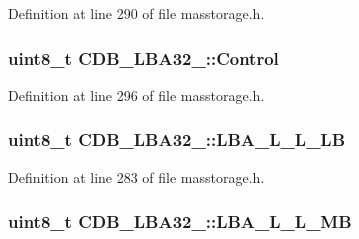 \-Definition at line 290 of file masstorage.\-h.

\hypertarget{struct_c_d_b___l_b_a32__16_aed4424e6a3afd515084359084a5e8fcb}{
\subsubsection[{\-Control}]{\setlength{\rightskip}{0pt plus 5cm}uint8\-\_\-t {\bf \-C\-D\-B\-\_\-\-L\-B\-A32\-\_\-::\-Control}}}\label{struct_c_d_b___l_b_a32__16_aed4424e6a3afd515084359084a5e8fcb}


\-Definition at line 296 of file masstorage.\-h.

\hypertarget{struct_c_d_b___l_b_a32__16_a1e239989f80f36157fd9271f2141acd1}{
\subsubsection[{\-L\-B\-A\-\_\-\-L\-\_\-\-L\-\_\-\-L\-B}]{\setlength{\rightskip}{0pt plus 5cm}uint8\-\_\-t {\bf \-C\-D\-B\-\_\-\-L\-B\-A32\-\_\-::\-L\-B\-A\-\_\-\-L\-\_\-\-L\-\_\-\-L\-B}}}\label{struct_c_d_b___l_b_a32__16_a1e239989f80f36157fd9271f2141acd1}


\-Definition at line 283 of file masstorage.\-h.

\hypertarget{struct_c_d_b___l_b_a32__16_a9b4af68995d60538e2c15ce5e2c06754}{
\subsubsection[{\-L\-B\-A\-\_\-\-L\-\_\-\-L\-\_\-\-M\-B}]{\setlength{\rightskip}{0pt plus 5cm}uint8\-\_\-t {\bf \-C\-D\-B\-\_\-\-L\-B\-A32\-\_\-::\-L\-B\-A\-\_\-\-L\-\_\-\-L\-\_\-\-M\-B}}}\label{struct_c_d_b___l_b_a32__16_a9b4af68995d60538e2c15ce5e2c06754}


